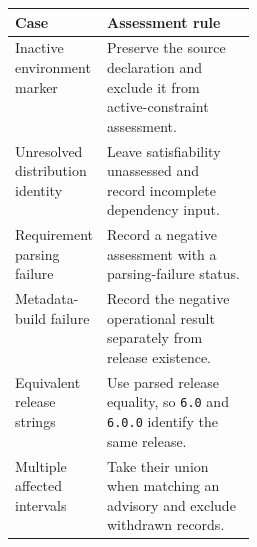 \noindent\begin{minipage}{\linewidth}
\centering\footnotesize
{}
\label{tab:assessment_rules}
\setlength{\tabcolsep}{4pt}
\renewcommand{\arraystretch}{1.12}
\begin{tabularx}{\linewidth}{@{}>{\raggedright\arraybackslash}p{0.28\linewidth}>{\raggedright\arraybackslash}X@{}}
\toprule
\textbf{Case} & \textbf{Assessment rule} \\
\midrule
Inactive environment marker & Preserve the source declaration and exclude it from active-constraint assessment. \\
Unresolved distribution identity & Leave satisfiability unassessed and record incomplete dependency input. \\
Requirement parsing failure & Record a negative assessment with a parsing-failure status. \\
Metadata-build failure & Record the negative operational result separately from release existence. \\
Equivalent release strings & Use parsed release equality, so \texttt{6.0} and \texttt{6.0.0} identify the same release. \\
Multiple affected intervals & Take their union when matching an advisory and exclude withdrawn records. \\
\bottomrule
\end{tabularx}
\end{minipage}
